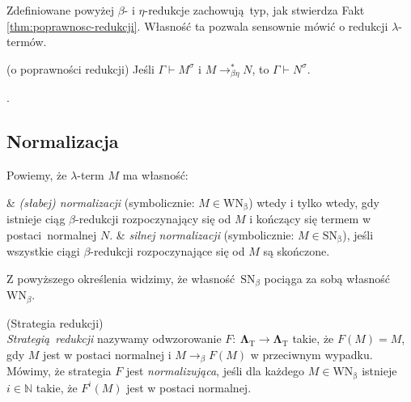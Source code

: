 Zdefiniowane powyżej  \(\beta\)- i \(\eta\)-redukcje zachowują typ, jak stwierdza Fakt \ref{thm:poprawnosc-redukcji}. Własność ta pozwala sensownie mówić o redukcji \(\lambda\)-termów.
\begin{fakt}\label{thm:poprawnosc-redukcji}(o poprawności redukcji)
  Jeśli \(\Gamma\vdash M^\sigma\) i \(M\longrightarrow^{*}_{\beta\eta}N\), to
  \(\Gamma\vdash N^\sigma\).
  \begin{dowod}
  \cite[tw. 1B.14]{barendregt_dekkers_statman_2013}.
  \end{dowod}
\end{fakt}
\subsection{Normalizacja}
\noindent Powiemy, że \(\lambda\)-term \(M\) ma własność:
\begin{easylist}
  & \emph{(słabej) normalizacji} (symbolicznie: \(M\in\mathrm{WN_{\beta}}\)) wtedy i tylko wtedy, gdy istnieje ciąg \(\beta\)-redukcji rozpoczynający się od \(M\) i kończący się termem w postaci normalnej \(N\).
  &  \emph{silnej normalizacji} (symbolicznie: \(M\in\mathrm{SN_{\beta}}\)), jeśli wszystkie ciągi \(\beta\)-redukcji rozpoczynające się od \(M\) są skończone.
\end{easylist}
\begin{uwaga*}
Z powyższego określenia  widzimy, że własność \(\mathrm{SN}_{\beta}\) pociąga za sobą własność \(\mathrm{WN}_{\beta}\).
\end{uwaga*}
\begin{definicja}(Strategia redukcji)\\
  \emph{Strategią redukcji} nazywamy odwzorowanie \(F:\:\mathbf{\Lambda}_{\mathrm{T}}\longrightarrow\mathbf{\Lambda}_{\mathrm{T}}\) takie, że \(F(M)=M\), gdy \(M\) jest w postaci normalnej i \(M\longrightarrow_{\beta}F(M)\) w przeciwnym wypadku. Mówimy, że strategia \(F\) jest \emph{normalizująca}, jeśli dla każdego \(M\in \mathrm{WN_\beta}\) istnieje \(i\in\mathbb{N}\) takie, że \(F^i (M)\) jest w postaci normalnej.
\end{definicja}

